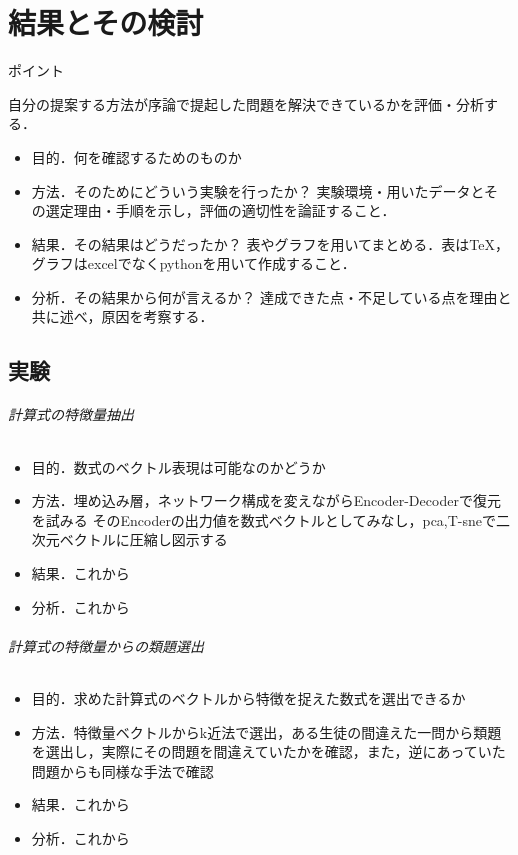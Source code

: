 \documentclass[a4j,11pt,report]{jsbook}
\newcommand{\point}[1]{
\begin{itembox}[l]{ポイント}
  #1
\end{itembox}
}
\begin{document}
\clearpage










\chapter{結果とその検討 \label{ch:result}}

\point{
自分の提案する方法が序論で提起した問題を解決できているかを評価・分析する．
\begin{itemize}
  \item 目的．何を確認するためのものか
  \item 方法．そのためにどういう実験を行ったか？ 実験環境・用いたデータとその選定理由・手順を示し，評価の適切性を論証すること．
  \item 結果．その結果はどうだったか？ 表やグラフを用いてまとめる．表はTeX，グラフはexcelでなくpythonを用いて作成すること．
  \item 分析．その結果から何が言えるか？ 達成できた点・不足している点を理由と共に述べ，原因を考察する．
\end{itemize}
}
\section{実験}
\subparagraph{計算式の特徴量抽出}
\begin{itemize}
  \item 目的．数式のベクトル表現は可能なのかどうか
  \item 方法．埋め込み層，ネットワーク構成を変えながらEncoder-Decoderで復元を試みる
  そのEncoderの出力値を数式ベクトルとしてみなし，pca,T-sneで二次元ベクトルに圧縮し図示する
  \item 結果．これから
  \item 分析．これから
\end{itemize}

\subparagraph{計算式の特徴量からの類題選出}
\begin{itemize}
  \item 目的．求めた計算式のベクトルから特徴を捉えた数式を選出できるか
  \item 方法．特徴量ベクトルからk近法で選出，ある生徒の間違えた一問から類題を選出し，実際にその問題を間違えていたかを確認，また，逆にあっていた問題からも同様な手法で確認
  \item 結果．これから
  \item 分析．これから
\end{itemize}
\end{document}
